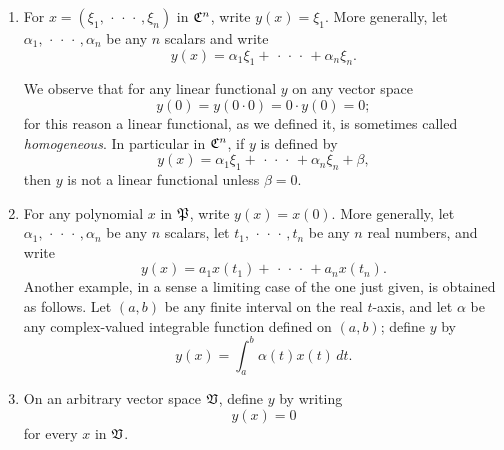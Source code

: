 \begin{enumerate}[wide, label=(\arabic*), nosep]
    \item  For \(x =(\xi_1, \,\cdot\,\cdot\,\cdot\,, \xi_n)\) in \(\mathfrak{C}^n\),
    write \(y(x) = \xi_1\). More generally, let \(\alpha_1,
    \,\cdot\,\cdot\,\cdot\,, \alpha_n\) be any \(n\) scalars and write
    \begin{equation*}
        y(x) = \alpha_1 \xi_1 + \,\cdot\,\cdot\,\cdot\, + \alpha_n \xi_n.
    \end{equation*}

    We observe that for any linear functional \(y\) on any vector space
    \begin{equation*}
        y(0) = y(0 \cdot 0) = 0 \cdot y(0) = 0;
    \end{equation*}
    for this reason a linear functional, as we defined it, is sometimes called
    \emph{homogeneous}. In particular in \(\mathfrak{C}^n\), if \(y\) is defined by
    \begin{equation*}
        y(x) = \alpha_1 \xi_1 + \,\cdot\,\cdot\,\cdot\, + \alpha_n \xi_n + \beta,
    \end{equation*}
    then \(y\) is not a linear functional unless \(\beta = 0\).
    
    \item For any polynomial \(x\) in \(\mathfrak{P}\), write \(y(x) = x(0)\). More
    generally, let \(\alpha_1, \,\cdot\,\cdot\,\cdot\,, \alpha_n\) be any \(n\)
    scalars, let \(t_1, \,\cdot\,\cdot\,\cdot\,, t_n\) be any \(n\) real
    numbers, and write
    \begin{equation*}
        y(x) = a_1 x(t_1) + \,\cdot\,\cdot\,\cdot\, + a_n x(t_n).
    \end{equation*}
    Another example, in a sense a limiting case of the one just given, is obtained
    as follows. Let \((a, b)\) be any finite interval on the real \(t\)-axis, and
    let \(\alpha\) be any complex-valued integrable function defined on \((a, b)\);
    define \(y\) by
    \begin{equation*}
        y(x) = \int_a^b \alpha(t) x(t) \, dt.
    \end{equation*}

    \item On an arbitrary vector space \(\mathfrak{V}\), define \(y\) by writing
    \begin{equation*}
        y(x) = 0
    \end{equation*}
    for every \(x\) in \(\mathfrak{V}\).
\end{enumerate}

